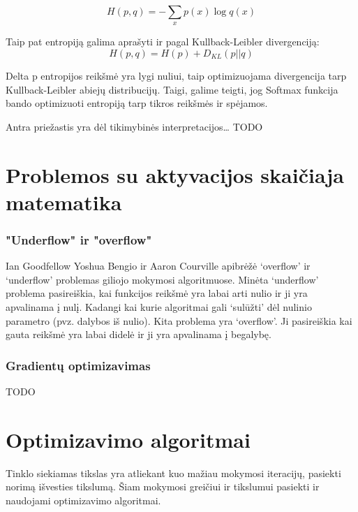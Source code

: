 \documentclass{VUMIFInfKursinis}
\begin{document}
\[
H(p, q) = - \sum_{x}p(x) \log q(x)
\]

\par
Taip pat entropiją galima aprašyti ir pagal Kullback-Leibler divergenciją:
\[
H(p, q) = H(p) + D_{KL}(p || q)
\]
\par
Delta p entropijos reikšmė yra lygi nuliui, taip optimizuojama divergencija tarp
Kullback-Leibler abiejų distribucijų. Taigi, galime teigti, jog Softmax funkcija
bando optimizuoti entropiją tarp tikros reikšmės ir spėjamos.
\par
Antra priežastis yra dėl tikimybinės interpretacijos…
TODO

\section{Problemos su aktyvacijos skaičiaja matematika}
\subsubsection{"Underflow" ir "overflow"}
\par
Ian Goodfellow Yoshua Bengio ir Aaron Courville apibrėžė ‘overflow’ ir ‘underflow’
problemas giliojo mokymosi algoritmuose. Minėta ‘underflow’ problema pasireiškia,
kai funkcijos reikšmė yra labai arti nulio ir ji yra apvalinama į nulį. Kadangi kai
kurie algoritmai gali ‘sulūžti’ dėl nulinio parametro (pvz. dalybos iš nulio). Kita
problema yra ‘overflow’. Ji pasireiškia kai gauta reikšmė yra labai didelė ir ji yra
apvalinama į begalybę.

\subsubsection{Gradientų optimizavimas}
TODO

\section{Optimizavimo algoritmai}
\par
Tinklo siekiamas tikslas yra atliekant kuo mažiau mokymosi iteracijų, pasiekti norimą
išvesties tikslumą. Šiam mokymosi greičiui ir tikslumui pasiekti ir naudojami
optimizavimo algoritmai.
\end{document}
